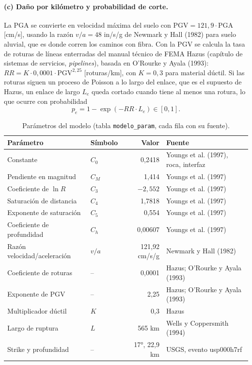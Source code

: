 \documentclass[11pt,a4paper]{article}
\newcommand{\cod}[1]{\texttt{#1}}
\begin{document}
\paragraph{(c) Daño por kilómetro y probabilidad de corte.} La PGA se convierte en velocidad máxima del
suelo con $\mathrm{PGV} = 121{,}9 \cdot \mathrm{PGA}$ [cm/s], usando la razón $v/a = 48$ in/s/g de
Newmark y Hall (1982) para suelo aluvial, que es donde corren los caminos con fibra. Con la PGV se
calcula la tasa de roturas de líneas enterradas del manual técnico de FEMA Hazus (capítulo de sistemas
de servicios, \emph{pipelines}), basada en O'Rourke y Ayala (1993):
$RR = K \cdot 0{,}0001 \cdot \mathrm{PGV}^{2{,}25}$ [roturas/km], con $K = 0{,}3$ para material dúctil.
Si las roturas siguen un proceso de Poisson a lo largo del enlace, que es el supuesto de Hazus, un
enlace de largo $L_e$ queda cortado cuando tiene al menos una rotura, lo que ocurre con probabilidad
\begin{equation}
p_e = 1 - \exp\left(-RR \cdot L_e\right) \in [0, 1].
\end{equation}

\begin{table}[h]
\centering
\small
\begin{tabular}{llr p{6.2cm}}
\toprule
Parámetro & Símbolo & Valor & Fuente \\
\midrule
Constante & $C_0$ & 0,2418 & Youngs et al. (1997), roca, interfaz \\
Pendiente en magnitud & $C_M$ & 1,414 & Youngs et al. (1997) \\
Coeficiente de $\ln R$ & $C_3$ & $-2{,}552$ & Youngs et al. (1997) \\
Saturación de distancia & $C_4$ & 1,7818 & Youngs et al. (1997) \\
Exponente de saturación & $C_5$ & 0,554 & Youngs et al. (1997) \\
Coeficiente de profundidad & $C_h$ & 0,00607 & Youngs et al. (1997) \\
Razón velocidad/aceleración & $v/a$ & 121,92 cm/s/g & Newmark y Hall (1982) \\
Coeficiente de roturas & -- & 0,0001 & Hazus; O'Rourke y Ayala (1993) \\
Exponente de PGV & -- & 2,25 & Hazus; O'Rourke y Ayala (1993) \\
Multiplicador dúctil & $K$ & 0,3 & Hazus \\
Largo de ruptura & $L$ & 565 km & Wells y Coppersmith (1994) \\
Strike y profundidad & -- & 17°, 22,9 km & USGS, evento usp000h7rf \\
\bottomrule
\end{tabular}
\caption{Parámetros del modelo (tabla \cod{modelo\_param}, cada fila con su fuente).}
\end{table}
\end{document}
